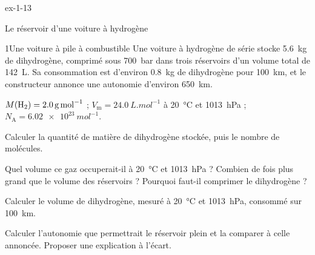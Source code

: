 \begin{blocLivre}{ex-1-13}
\begin{exercice}[3]{Le réservoir d'une voiture à hydrogène}
\begin{docu}{1}{Une voiture à pile à combustible}
Une voiture à hydrogène de série stocke \qty{5,6}{kg} de dihydrogène, comprimé sous \qty{700}{bar} dans trois réservoirs d'un volume total
de \qty{142}{L}. Sa consommation est d'environ \qty{0,8}{kg} de dihydrogène pour \qty{100}{km}, et le constructeur annonce une autonomie
d'environ \qty{650}{km}.
\end{docu}
\begin{donnees}
$M(\ce{H2})=\qty{2,0}{g.mol^{-1}}$ ; $V_\mathrm{m}=\qty{24,0}{L.mol^{-1}}$ à \qty{20}{\degreeCelsius} et \qty{1013}{hPa} ; $N_\mathrm{A}=\qty{6,02e23}{mol^{-1}}$.
\end{donnees}
\begin{questions}
\item Calculer la quantité de matière de dihydrogène stockée, puis le nombre de molécules.
\item Quel volume ce gaz occuperait-il à \qty{20}{\degreeCelsius} et \qty{1013}{hPa} ? Combien de fois plus grand que le volume des réservoirs ?
Pourquoi faut-il comprimer le dihydrogène ?
\item Calculer le volume de dihydrogène, mesuré à \qty{20}{\degreeCelsius} et \qty{1013}{hPa}, consommé sur \qty{100}{km}.
\item \initiative Calculer l'autonomie que permettrait le réservoir plein et la comparer à celle annoncée. Proposer une
explication à l'écart.
\end{questions}
\end{exercice}
\end{blocLivre}
